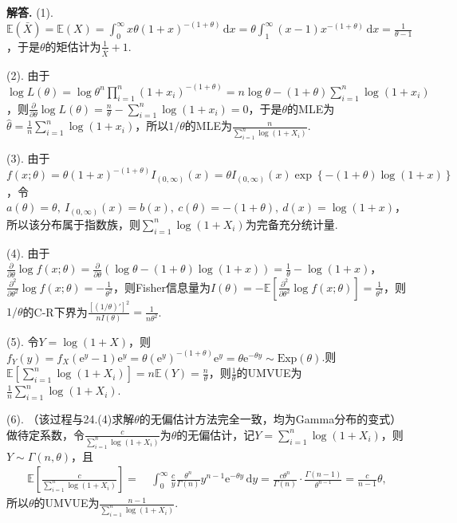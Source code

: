 \documentclass[12pt, a4paper, oneside]{ctexart}
\newenvironment{solution}[1][]{\par\noindent\textbf{#1解答. }}{\smallskip\par}  %
\def\E{\mathbb{E}}          %
\def\d{\mathrm{d}}          %
\def\e{\mathrm{e}}          %
\def\add{\vspace{1ex}}      %
\begin{document}
\begin{solution}
    (1). $\E(\bar{X}) = \E(X) = \int_0^\infty x\theta(1+x)^{-(1+\theta)}\,\d x = \theta\int_1^\infty (x-1)x^{-(1+\theta)}\,\d x = \frac{1}{\theta-1}$，于是$\theta$的矩估计为$\frac{1}{\bar{X}}+1$.

    (2). 由于$\log L(\theta) = \log \theta^n\prod_{i=1}^n(1+x_i)^{-(1+\theta)} = n\log\theta - (1+\theta)\sum_{i=1}^n\log(1+x_i)$，则$\frac{\partial}{\partial \theta}\log L(\theta) = \frac{n}{\theta}-\sum_{i=1}^n\log(1+x_i) = 0$，于是$\theta$的MLE为$\hat{\theta} = \frac{1}{n}\sum_{i=1}^n\log(1+x_i)$，\add 所以$1/\theta$的MLE为$\frac{n}{\sum_{i=1}^n\log(1+X_i)}$.\add

    (3). 由于$f(x;\theta) = \theta(1+x)^{-(1+\theta)}I_{(0,\infty)}(x) = \theta I_{(0,\infty)}(x)\exp\left\{-(1+\theta)\log(1+x)\right\}$，\add 令$a(\theta) = \theta,\ I_{(0,\infty)}(x) = b(x),\ c(\theta) = -(1+\theta),\ d(x) = \log(1+x)$，所以该分布属于指数族，则$\sum_{i=1}^n\log(1+X_i)$为完备充分统计量.\add

    (4). \add 由于$\frac{\partial}{\partial \theta}\log f(x;\theta) = \frac{\partial}{\partial \theta}(\log\theta - (1+\theta)\log(1+x)) = \frac{1}{\theta}-\log(1+x)$，$\frac{\partial^2}{\partial\theta^2}\log f(x;\theta) = -\frac{1}{\theta^2}$，则Fisher信息量为$I(\theta) = -\E\left[\frac{\partial^2}{\partial\theta^2}\log f(x;\theta)\right] = \frac{1}{\theta^2}$，则$1/\theta$的C-R下界为$\frac{\left[(1/\theta)'\right]^2}{nI(\theta)} = \frac{1}{n\theta^2}$.\add

    (5). 令$Y = \log (1+X)$，则$f_Y(y) = f_X(\e^y-1)\e^y = \theta(\e^y)^{-(1+\theta)}\e^y = \theta\e^{-\theta y}\sim \text{Exp}(\theta)$.\add 则$\E\left[\sum_{i=1}^n\log(1+X_i)\right] = n\E(Y) = \frac{n}{\theta}$，则$\frac{1}{\theta}$的UMVUE为$\frac{1}{n}\sum_{i=1}^n\log(1+X_i)$.\add

    (6). （该过程与24.(4)求解$\theta$的无偏估计方法完全一致，均为Gamma分布的变式）做待定系数，令$\frac{c}{\sum_{i=1}^n\log(1+X_i)}$为$\theta$的无偏估计，记$Y = \sum_{i=1}^n\log(1+X_i)$，则$Y\sim \Gamma(n,\theta)$，且
    \begin{align*}
        \E\left[\frac{c}{\sum_{i=1}^n\log (1+X_i)}\right] =&\ \int_0^\infty\frac{c}{y}\frac{\theta^n}{\Gamma(n)}y^{n-1}\e^{-\theta y}\,\d y
        = \frac{c\theta^n}{\Gamma(n)}\cdot\frac{\Gamma(n-1)}{\theta^{n-1}} = \frac{c}{n-1}\theta,
    \end{align*}
    所以$\theta$的UMVUE为$\frac{n-1}{\sum_{i=1}^n\log(1+X_i)}$.
\end{solution}
\end{document}
